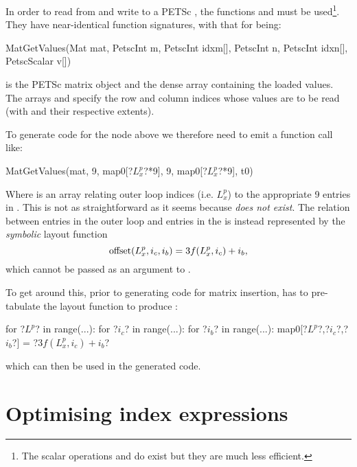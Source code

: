 \documentclass[thesis]{subfiles}
\begin{document}
In order to read from and write to a PETSc , the functions  and  must be used\footnote{The scalar operations  and  do exist but they are much less efficient.}.
They have near-identical function signatures, with that for  being:
\begin{cinline}
  MatGetValues(Mat mat,
               PetscInt m, PetscInt idxm[],
               PetscInt n, PetscInt idxn[],
               PetscScalar v[])
\end{cinline}
 is the PETSc matrix object and  the dense array containing the loaded values\footnotemark.
The arrays  and  specify the row and column indices whose values are to be read (with  and  their respective extents).


To generate code for the  node above we therefore need to emit a function call like:
\begin{cinline}
  MatGetValues(mat, 9, map0[?$L^p_x$?*9], 9, map0[?$L^p_x$?*9], t0)
\end{cinline}
Where  is an array relating outer loop indices (i.e. $L^p_x$) to the appropriate 9 entries in .
This is not as straightforward as it seems because  \emph{does not exist}.
The relation between entries in the outer loop and entries in the  is instead represented by the \emph{symbolic} layout function
\begin{equation}
  \textnormal{offset}(L^p_x,i_c,i_b) = 3 f(L^p_x,i_c) + i_b,
\end{equation}
which cannot be passed as an argument to .

To get around this, prior to generating code for matrix insertion,  has to pre-tabulate the layout function to produce :
\begin{pyinline}
  for ?$L^p$? in range(...):
    for ?$i_c$? in range(...):
      for ?$i_b$? in range(...):
        map0[?$L^p$?,?$i_c$?,?$i_b$?] = ?$3 f(L^p_x,i_c) + i_b$?
\end{pyinline}
which can then be used in the generated code.

\section{Optimising index expressions}
\label{sec:codegen_optimisation}
\end{document}
